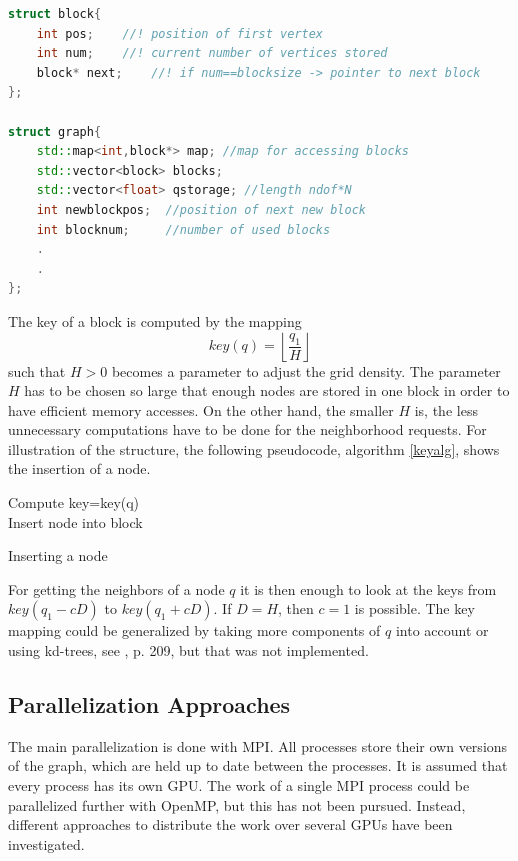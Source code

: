 \documentclass[twocolumn]{svjour3}
\newcommand{\R}{\mathbb{R}}
\begin{document}
\footnotesize
\begin{lstlisting}[language=C++, frame=single, float=*,
	caption=Roadmap graph structure.,
	label=code7
]
struct block{
	int pos;	//! position of first vertex
	int num;	//! current number of vertices stored
	block* next; 	//! if num==blocksize -> pointer to next block
};

struct graph{
    std::map<int,block*> map; //map for accessing blocks
    std::vector<block> blocks;
    std::vector<float> qstorage; //length ndof*N
    int newblockpos;  //position of next new block
    int blocknum;     //number of used blocks
    .
    .
};
\end{lstlisting}
\normalsize

The key of a block is computed by the mapping
\begin{equation}
	key(q) = \left\lfloor \frac{q_1}{H} \right\rfloor
\end{equation}
such that $H>0$ becomes a parameter to adjust the grid density.
The parameter $H$ has to be chosen so large that enough nodes are stored in one block in order to have efficient memory accesses.
On the other hand, the smaller $H$ is, the less unnecessary computations have to be done for the neighborhood requests.
For illustration of the structure, the following pseudocode, algorithm \ref{keyalg}, shows the insertion of a node.

\begin{algorithm}\label{keyalg}
	\KwData{$q\in\R^d$}
	Compute key=key(q)\\ 
	Insert node into block
	\caption{Inserting a node}
\end{algorithm}

For getting the neighbors of a node $q$ it is then enough to look at the keys from $key(q_1-cD)$ to $key(q_1+cD)$. 
If $D=H$, then $c=1$ is possible.
The key mapping could be generalized by taking more components of $q$ into account or using kd-trees, see \cite{prm1}, p. 209, but that was not implemented.

\subsection{Parallelization Approaches}

The main parallelization is done with MPI. All processes store their own versions of the graph, which are held up to date between the processes.
It is assumed that every process has its own GPU.
The work of a single MPI process could be parallelized further with OpenMP, but this has not been pursued.
Instead, different approaches to distribute the work over several GPUs have been investigated.
\end{document}
